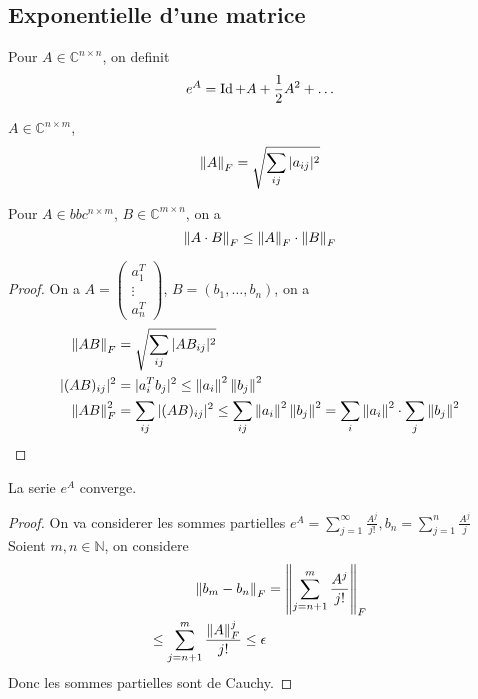 \documentclass[../main.tex]{subfiles}
\begin{document}
\subsection{Exponentielle d'une matrice}
\begin{defn}
	Pour $ A \in \mathbb{C}^{n\times n}$, on definit
	\[ 
	e^{A}= \operatorname*{Id} + A + \frac{1}{2}A^{2} + \ldots
	\]
	
\end{defn}
\begin{defn}
	$A \in \mathbb{C}^{n\times m}$,
	\[ 
	\left\lVert A\right\rVert _F = \sqrt{ \sum_{ij} |a_{ij} |^{2}} 
	\]
		
\end{defn}
\begin{lemma}
Pour $A \in bbc^{n \times m}$, $B \in \mathbb{C}^{m\times n}$, on a 
\[ 
\left\lVert A\cdot B\right\rVert _F \leq \left\lVert A\right\rVert _F \cdot \left\lVert B\right\rVert _F
\]
	
\end{lemma}
\begin{proof}
On a $ A = \begin{pmatrix}
a_1^{T}\\\vdots\\a_n^{T}
\end{pmatrix} $, $B= ( b_1,\ldots, b_n) $, on a
\begin{align*}
\left\lVert AB\right\rVert _F &= \sqrt{\sum_{ij} |AB_{ij} |^{2}} \\
| ( AB) _{ij} |^{2}&= |a_i^{T} b_j|^{2} \leq  \left\lVert a_i\right\rVert ^{2} \left\lVert b_j\right\rVert ^{2}\\
\left\lVert AB\right\rVert _F^{2} &= \sum_{ij} | ( AB) _{ij}| ^{2} \leq \sum_{ij} \left\lVert a_i\right\rVert ^{2} \left\lVert b_j\right\rVert ^{2}= \sum_{i} \left\lVert a_i\right\rVert ^{2} \cdot \sum_{j} \left\lVert b_j\right\rVert ^{2}
\end{align*}


\end{proof}
\begin{lemma}
La serie $e^{A}$ converge.
\end{lemma}
\begin{proof}
On va considerer les sommes partielles $ e^{A} = \sum_{j=1}^{ \infty } \frac{A^{j}}{j!}, b_n = \sum_{j=1}^{ n}\frac{A^{j}}{j}$\\
Soient $m,n \in \mathbb{N}$, on considere
\begin{align*}
\left\lVert b_m -b_n\right\rVert _F &= \left\lVert \sum_{j=n+1}^{ m}\frac{A^{j}}{j!}\right\rVert _F\\
\leq \sum_{j=n+1}^{ m} \frac{\left\lVert A\right\rVert _F^{j}}{j!} \leq  \epsilon
\end{align*}
Donc les sommes partielles sont de Cauchy.
\end{proof}
\end{document}
